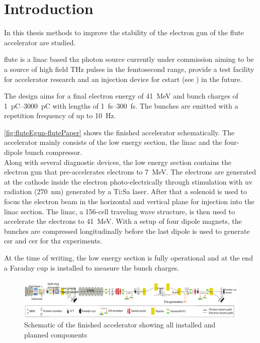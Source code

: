 \chapter{Introduction}
In this thesis methods to improve the stability of the electron gun of the \gls{flute} accelerator are studied.

\Gls{flute} is a \gls{linac} based \gls{thz} photon source currently under commission aiming to be a source of high field THz pulses in the femtosecond range, provide a test facility for accelerator research and an injection device for \gls{cstart} (see \cite{SchaeferHaererPapash2019_1000091183}) in the future. \cite{Naknaimueang:2011zz}

The design aims for a final electron energy of \SI{41}{\MeV} and bunch charges of \SIrange{1}{3000}{\pico\coulomb} with lengths of \SIrange{1}{300}{\fs}. The bunches are emitted with a repetition frequency of up to \SI{10}{\hertz}. \cite{Malygin2018}

\autoref{fig:fluteEgun-flutePaper} shows the finished accelerator schematically. The accelerator mainly consists of the low energy section, the \gls{linac} and the four-dipole bunch compressor.\\
Along with several diagnostic devices, the low energy section contains the electron gun that pre-accelerates electrons to \SI{7}{\MeV}. The electrons are generated at the cathode inside the electron photo-electrically through stimulation with \gls{uv} radiation (\SI{270}{\nm}) generated by a Ti:Sa laser. After that a solenoid is used to focus the electron beam in the horizontal and vertical plane for injection into the \gls{linac} section. The \gls{linac}, a 156-cell traveling wave structure, is then used to accelerate the electrons to \SI{41}{\MeV}. With a setup of four dipole magnets, the bunches are compressed longitudinally before the last dipole is used to generate \gls{csr} and \gls{cer} for \gls{thz} experiments. \cite{Nasse:IPAC13-WEPWA010}

At the time of writing, the low energy section is fully operational and at the end a Faraday cup is installed to measure the bunch charges.

\begin{figure}[tb]
	\centering
	\includegraphics[width=\textwidth]{chap/StabilityOfTheElectronGun/img/flutePaper.png}
	\caption{Schematic of the finished accelerator showing all installed and planned components \cite{Yan2018}}
	\label{fig:fluteEgun-flutePaper}
\end{figure}

